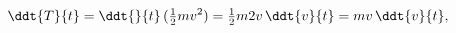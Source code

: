 \documentclass[12pt,preview]{standalone}
\begin{document}
\begin{preview}
\begin{equation}
\label{Eq:I:13:2}
\ddt{T}{t}=\ddt{}{t}\,(\tfrac{1}{2}mv^2)=
\tfrac{1}{2}m2v\,\ddt{v}{t}=mv\,\ddt{v}{t},
\end{equation}
\end{preview}
\end{document}
